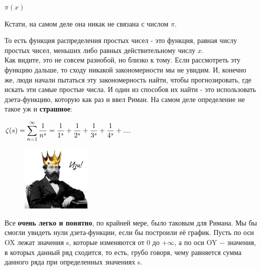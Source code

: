\hspace{90}$\pi(x)$


\hspace{20}Кстати, на самом деле она никак не связана с числом $\pi$.


\hspace{20}То есть функция распределения простых чисел - это функция, равная числу простых чисел, меньших либо равных действительному числу $x$. \\



\hspace{20} Как видите, это не совсем разнобой, но близко к тому. Если рассмотреть эту функцию дальше, то сходу никакой закономерности мы не увидим. И, конечно же, люди начали пытаться эту закономерность найти, чтобы прогнозировать, где искать эти самые простые числа. И один из способов их найти - это использовать дзета-функцию, которую как раз и ввел Риман. На самом деле определение не такое уж и \textbf{страшное}:
\newline 
\centerline{$\zeta(s)=\displaystyle\sum\limits_{n=1}^{\infty}\dfrac{1}{n^s} = \dfrac{1}{1^s}+\dfrac{1}{2^s}+\dfrac{1}{3^s}+\dfrac{1}{4^s}+....$}



\hspace{20}
\newline \hspace{20}
\begin{figure}
 \vspace{-40pt}
  \begin{center}
    \includegraphics[width=0.3\textwidth]{easy.png}
  \end{center}
   \vspace{-80pt}
\end{figure}
\hspace{20}Все \textbf{очень легко и понятно}, по крайней мере, было таковым для Римана. Мы бы смогли увидеть нули дзета-функции, если бы построили её график. Пусть по оси OX лежат значения s, которые изменяются от 0 до $+\infty $, а по оси OY $ - $ значения, в которых данный ряд сходится, то есть, грубо говоря, чему равняется сумма данного ряда при определенных значениях s.

